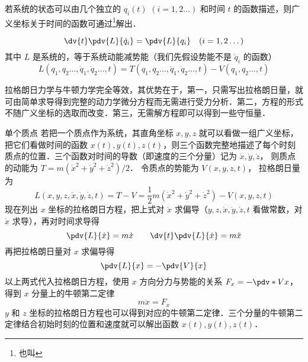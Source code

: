 

若系统的状态可以由几个独立的 $q_i(t)$ $(i=1,2\dots)$ 和时间 $t$ 的函数描述，则广义坐标关于时间的函数可通过\footnote{也叫}解出．

\begin{equation}\label{Lagrng_eq1}
\dv{t} \pdv{L}{\dot q_i} = \pdv{L}{q_i}
\quad (i=1,2\dots)
\end{equation}
其中 $L$ 是系统的，等于系统动能减势能（我们先假设势能不是 $\dot q_i$ 的函数）
\begin{equation}\label{Lagrng_eq2}
L(q_1,q_2\dots,\dot q_1,\dot q_2\dots,t) = T(q_1,q_2\dots,\dot q_1,\dot q_2\dots,t) - V(q_1,q_2\dots, t)
\end{equation}


拉格朗日力学与牛顿力学完全等效，其优势在于，第一，只需写出拉格朗日量，就可由简单求导得到完整的动力学微分方程而无需进行受力分析．第二，方程的形式不随广义坐标的选取而改变．第三，无需解方程即可以得到一些守恒量．

\begin{exam}{单个质点}\label{Lagrng_ex1}
若把一个质点作为系统，其直角坐标 $x,y,z$ 就可以看做一组广义坐标，把它们看做时间的函数 $x(t), y(t), z(t)$，则三个函数完整地描述了每个时刻质点的位置．三个函数对时间的导数（即速度的三个分量）记为 $\dot x, \dot y, \dot z$， 则质点的动能为 $T=m(\dot x^2+\dot y^2+\dot z^2)/2$． 令质点的势能为 $V(x,y,z,t)$， 拉格朗日量为
\begin{equation}
L(x,y,z, \dot x, \dot y, \dot z, t) = T-V = \frac 12 m(\dot x^2+\dot y^2+\dot z^2) - V(x,y,z,t)
\end{equation}
现在列出 $x$ 坐标的拉格朗日方程，把上式对 $\dot x$ 求偏导（$y,z, \dot x, \dot y, \dot z, t$ 看做常数，对 $\dot x$ 求导），再对时间求导得
\begin{equation}
\pdv{L}{\dot x} = m\dot x
\qquad
\dv{t}\pdv{L}{\dot x} = m\ddot x
\end{equation}
再把拉格朗日量对 $x$ 求偏导得
\begin{equation}
\pdv{L}{x} = -\pdv{V}{x}
\end{equation}
以上两式代入拉格朗日方程，使用 $x$ 方向分力与势能的关系 ${F_x} =  - \pdv*{V}{x}$， 得到 $x$ 分量上的牛顿第二定律
\begin{equation}
m\ddot x = F_x
\end{equation}
$y$ 和 $z$ 坐标的拉格朗日方程也可以得到对应的牛顿第二定律．三个分量的牛顿第二定律结合初始时刻的位置和速度就可以解出函数 $x(t), y(t), z(t)$． 
\end{exam}

